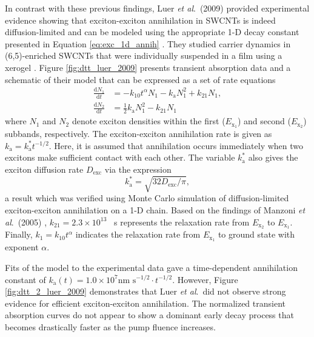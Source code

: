 In contrast with these previous findings, Luer \textit{et al}.\ (2009) provided experimental evidence showing that exciton-exciton annihilation in SWCNTs is indeed diffusion-limited and can be modeled using the appropriate 1-D decay constant presented in Equation \eqref{eq:exc_1d_annih} \cite{luer2009size}. They studied carrier dynamics in (6,5)-enriched SWCNTs that were individually suspended in a film using a xerogel \cite{luer2009size}. Figure \ref{fig:dtt_luer_2009} presents transient absorption data and a schematic of their model that can be expressed as a set of rate equations
%
\begin{equation}
	\begin{split}
			\frac{\mathrm{d} N_1}{\mathrm{d} t} &= -k_{10} t^{\alpha} N_1 - k_\text{a}N_1^2 + k_{21} N_1,
			\\
			\frac{\mathrm{d} N_2}{\mathrm{d} t} &= \frac{1}{2} k_\text{a} N_1^2 - k_{21} N_1
	\end{split}
\end{equation}
%
where $N_1$ and $N_2$ denote exciton densities within the first ($E_{\text{x}_1}$) and second ($E_{\text{x}_2}$) subbands, respectively. The exciton-exciton annihilation rate is given as $k_\text{a} = k_\text{a}^* t^{-1/2}$. Here, it is assumed that annihilation occurs immediately when two excitons make sufficient contact with each other. The variable $k_\text{a}^*$ also gives the exciton diffusion rate $D_\text{exc}$ via the expression
\begin{equation}
	k_\text{a}^* = \sqrt{32 D_\text{exc}/ \pi},
	\label{eq:exc_anih_diffuse_luer_2009}
\end{equation}
a result which was verified using Monte Carlo simulation of diffusion-limited exciton-exciton annihilation on a 1-D chain. Based on the findings of Manzoni \textit{et al}.\ (2005) \cite{manzoni2005intersubband}, $k_{21} = 2.3 \times 10^{13}$ \si{\per\second} represents the relaxation rate from $ E_{\text{x}_2} $ to $E_{\text{x}_1}$. Finally, $k_{1} = k_{10}t^\alpha $ indicates the relaxation rate from $E_{\text{x}_1}$ to ground state with exponent $\alpha$.

Fits of the model to the experimental data gave a time-dependent annihilation constant of $k_\text{a}(t) = 1.0 \times 10^7 \text{nm } \text{s}^{-1/2} \cdot t^{-1/2}$. However, Figure \ref{fig:dtt_2_luer_2009} demonstrates that Luer \textit{et al}.\ did not observe strong evidence for efficient exciton-exciton annihilation. The normalized transient absorption curves do not appear to show a dominant early decay process that becomes drastically faster as the pump fluence increases.

